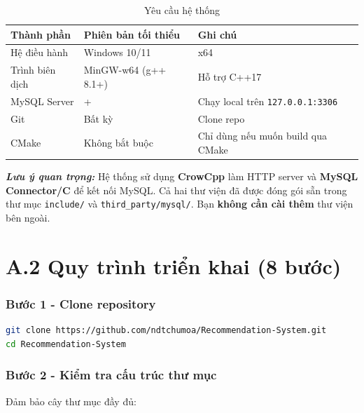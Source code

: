 \documentclass{report}
\begin{document}
\begin{table}[H]
    \centering
    \renewcommand{\arraystretch}{1.5}
    \begin{tabularx}{\textwidth}{|>{\raggedright\arraybackslash}p{3.5cm}|>{\raggedright\arraybackslash}p{4.5cm}|>{\raggedright\arraybackslash}X|}
        \hline
        \textbf{Thành phần} & \textbf{Phiên bản tối thiểu} & \textbf{Ghi chú} \\ \hline
        Hệ điều hành & Windows 10/11 & x64 \\ \hline
        Trình biên dịch & MinGW-w64 (g++ 8.1+) & Hỗ trợ C++17 \\ \hline
        MySQL Server & 8.0+ & Chạy local trên \texttt{127.0.0.1:3306} \\ \hline
        Git & Bất kỳ & Clone repo \\ \hline
        CMake & Không bắt buộc & Chỉ dùng nếu muốn build qua CMake \\ \hline
    \end{tabularx}
    \caption{Yêu cầu hệ thống}
    \label{tab:yeu_cau_he_thong}
\end{table}

\noindent\textbf{\textit{Lưu ý quan trọng:}} Hệ thống sử dụng \textbf{CrowCpp} làm HTTP server và \textbf{MySQL Connector/C} để kết nối MySQL. Cả hai thư viện đã được đóng gói sẵn trong thư mục \texttt{include/} và \texttt{third\_party/mysql/}. Bạn \textbf{không cần cài thêm} thư viện bên ngoài.

\section*{A.2 Quy trình triển khai (8 bước)}

\subsubsection*{Bước 1 - Clone repository}
\begin{lstlisting}[language=bash, style=cppstyle, caption={Clone repository}]
git clone https://github.com/ndtchumoa/Recommendation-System.git
cd Recommendation-System
\end{lstlisting}

\subsubsection*{Bước 2 - Kiểm tra cấu trúc thư mục}

Đảm bảo cây thư mục đầy đủ:
\vspace{0.3cm}
\vspace{0.3cm}
\end{document}
